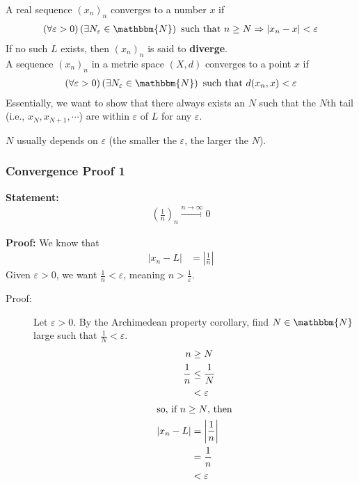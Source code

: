 \documentclass[10pt]{extarticle}
\newcommand{\N}{\mathbbm{N}}
\begin{document}
      A real sequence $(x_n)_n$ converges to a number $x$ if 
      \begin{align*}
        \left(\forall \varepsilon > 0\right)\left(\exists N_{\varepsilon}\in\N\right) \text{ such that } n\geq N \Rightarrow |x_n-x| < \varepsilon
      \end{align*}
      If no such $L$ exists, then $(x_n)_n$ is said to \textbf{diverge}.\\

      A sequence $(x_n)_n$ in a metric space $(X,d)$ converges to a point $x$ if
      \begin{align*}
        \left(\forall \varepsilon > 0\right)\left(\exists N_{\varepsilon}\in\N\right) \text{ such that } d(x_n,x) < \varepsilon
      \end{align*}
      Essentially, we want to show that there always exists an $N$ such that the $N$th tail (i.e., $x_{N}, x_{N+1},\cdots$) are within $\varepsilon$ of $L$ for any $\varepsilon$.
      \begin{description}
        \small
        \item[Note:] $N$ usually depends on $\varepsilon$ (the smaller the $\varepsilon$, the larger the $N$).
      \end{description}
    \subsubsection{Convergence Proof 1}%
      \textbf{Statement:}
      \begin{align*}
          \left(\frac{1}{n}\right)_{n} \xrightarrow{n\rightarrow\infty} 0
      \end{align*}

      \textbf{Proof:} We know that
      \begin{align*}
        |x_n - L| &= \left|\frac{1}{n}\right|
      \end{align*}
      Given $\varepsilon > 0$, we want $\frac{1}{n} < \varepsilon$, meaning $n > \frac{1}{\varepsilon}$.
      \begin{description}
        \item[Proof:] Let $\varepsilon > 0$. By the Archimedean property corollary, find $N\in\N$ large such that $\frac{1}{N} < \varepsilon$.
          \begin{align*}
            n &\geq N\\
            \frac{1}{n} &\leq \frac{1}{N}\\
                        &< \varepsilon\\
            \shortintertext{so, if $n\geq N$, then}
            |x_n - L| &= \left|\frac{1}{n}\right|\\
                      &= \frac{1}{n}\\
                      &< \varepsilon
          \end{align*}
      \end{description}
\end{document}
